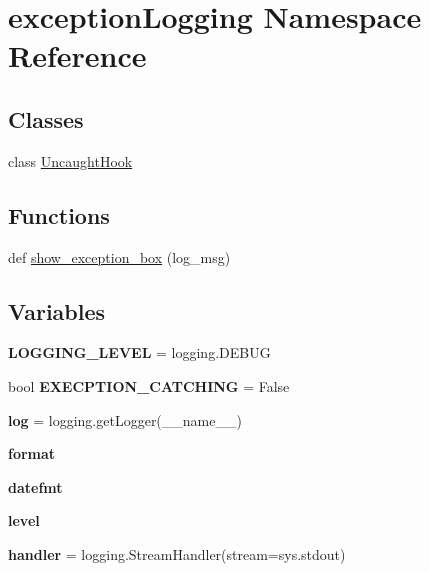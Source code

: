 \hypertarget{namespaceexception_logging}{}\section{exception\+Logging Namespace Reference}
\label{namespaceexception_logging}
\subsection*{Classes}
\begin{DoxyCompactItemize}
\item 
class \mbox{\hyperlink{classexception_logging_1_1_uncaught_hook}{Uncaught\+Hook}}
\end{DoxyCompactItemize}
\subsection*{Functions}
\begin{DoxyCompactItemize}
\item 
def \mbox{\hyperlink{namespaceexception_logging_a344573aa6a56cab1c4b1679a08589ada}{show\+\_\+exception\+\_\+box}} (log\+\_\+msg)
\end{DoxyCompactItemize}
\subsection*{Variables}
\begin{DoxyCompactItemize}
\item 
\mbox{\label{namespaceexception_logging_a6956c91ce1744486fcbcec7f72595a98}} 
{\bfseries L\+O\+G\+G\+I\+N\+G\+\_\+\+L\+E\+V\+EL} = logging.\+D\+E\+B\+UG
\item 
\mbox{\label{namespaceexception_logging_ae236bdc10fb42f9639ca6c9c8773e3e0}} 
bool {\bfseries E\+X\+E\+C\+P\+T\+I\+O\+N\+\_\+\+C\+A\+T\+C\+H\+I\+NG} = False
\item 
\mbox{\label{namespaceexception_logging_a6a12507197b316a6019753d9e38061e0}} 
{\bfseries log} = logging.\+get\+Logger(\+\_\+\+\_\+name\+\_\+\+\_\+)
\item 
\mbox{\label{namespaceexception_logging_a08ace275711265d3fc55c86a92619d93}} 
{\bfseries format}
\item 
\mbox{\label{namespaceexception_logging_af22a78dec835688503fab8653bf59e25}} 
{\bfseries datefmt}
\item 
\mbox{\label{namespaceexception_logging_ae5cf7f92855279df6d69f9af96430c8d}} 
{\bfseries level}
\item 
\mbox{\label{namespaceexception_logging_abbd66d1989cdae7a67efadfdf15bc06c}} 
{\bfseries handler} = logging.\+Stream\+Handler(stream=sys.\+stdout)
\end{DoxyCompactItemize}


